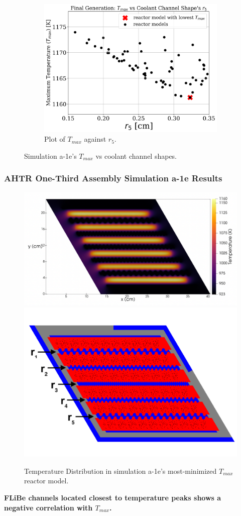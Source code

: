 \begin{frame}
\begin{figure}
\begin{subfigure}{0.3\textwidth}
            \includegraphics[width=\linewidth]{figures/a-1e-r5-pres.png}
            \caption{Plot of $T_{max}$ against $r_5$.}
            \label{fig:a-1e-r5} 
        \end{subfigure}
        \vspace{-0.3cm}
        \caption{Simulation a-1e's $T_{max}$ vs coolant channel shapes.}
    \end{figure}
\end{frame}

\begin{frame}
    \frametitle{AHTR One-Third Assembly Simulation a-1e Results}
    \begin{figure}
        \includegraphics[width=0.55\linewidth]{../docs/figures/a-1e-temp-distribution-2d.png} 
        \includegraphics[width=0.4\linewidth]{../docs/figures/coolant-channel-shape-assem.png} 
        \caption{Temperature Distribution in simulation a-1e's most-minimized $T_{max}$ reactor 
        model.}
    \end{figure}
    \begin{tcolorbox}[colback=illiniorange,colframe=illiniorange!50!black]
    \textbf{FLiBe channels located closest to temperature peaks shows a \\ negative 
    correlation with $T_{max}$.}
    \end{tcolorbox}
\end{frame}

